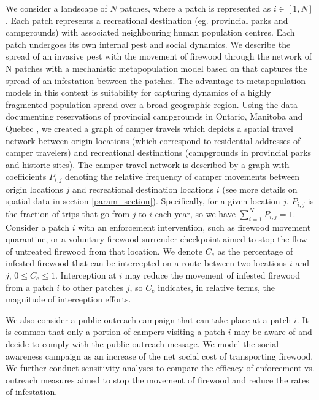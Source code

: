 We consider a landscape of $N$ patches, where a patch is represented as $i \in [1,N]$. Each patch represents a recreational destination (eg. provincial parks and campgrounds) with associated neighbouring human population centres. Each patch undergoes its own internal pest and social dynamics. We describe the spread of an invasive pest with the movement of firewood through the network of N patches with a mechanistic metapopulation model based on \cite{barlow2014modelling} that captures the spread of an infestation between the patches. The advantage to metapopulation models in this context is suitability for capturing dynamics of a highly fragmented population spread over a broad geographic region. Using the data documenting reservations of provincial campgrounds in Ontario, Manitoba and Quebec \cite{yemshanov2015optimal}, we created a graph of camper travels which depicts a spatial travel network between origin locations (which correspond to residential addresses of camper travelers) and recreational destinations (campgrounds in provincial parks and historic sites). 
The camper travel network is described by a graph with coefficients $P_{i,j}$ denoting the relative frequency of camper movements between origin locations $j$ and recreational destination locations $i$ (see more details on spatial data in section \ref{param_section}). Specifically, for a given location $j$, $P_{i,j}$ is the fraction of trips that go from $j$ to $i$ each year, so we have $\sum_{i = 1}^N P_{i,j} = 1$.
Consider a patch $i$ with an enforcement intervention, such as firewood movement quarantine, or a voluntary firewood surrender checkpoint aimed to stop the flow of untreated firewood from that location. We denote $C_e$ as the percentage of infested firewood that can be intercepted on a route between two locations $i$ and $j$, $0 \leq C_e \leq 1$. Interception at $i$ may reduce the movement of infested firewood from a patch $i$ to other patches $j$, so $C_e$ indicates, in relative terms, the magnitude of interception efforts. 

We also consider a public outreach campaign that can take place at a patch $i$. It is common that only a portion of campers visiting a patch $i$ may be aware of and decide to comply with the public outreach message. We model the social awareness campaign as an increase of the net social cost of transporting firewood. We further conduct sensitivity analyses to compare the efficacy of enforcement vs. outreach measures aimed to stop the movement of firewood and reduce the rates of infestation.


